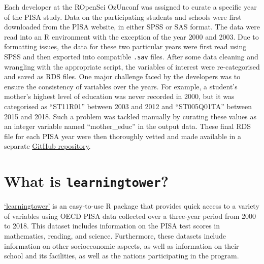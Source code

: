 Each developer at the ROpenSci OzUnconf was assigned to curate a
specific year of the PISA study. Data on the participating students and
schools were first downloaded from the PISA website, in either SPSS or
SAS format. The data were read into an R environment with the exception
of the year 2000 and 2003. Due to formatting issues, the data for these
two particular years were first read using SPSS and then exported into
compatible \texttt{.sav} files. After some data cleaning and wrangling
with the appropriate script, the variables of interest were
re-categorised and saved as RDS files. One major challenge faced by the
developers was to ensure the consistency of variables over the years.
For example, a student's mother's highest level of education was never
recorded in 2000, but it was categorised as ``ST11R01'' between 2003 and
2012 and ``ST005Q01TA'' between 2015 and 2018. Such a problem was
tackled manually by curating these values as an integer variable named
``mother\_educ'' in the output data. These final RDS file for each PISA
year were then thoroughly vetted and made available in a separate
\href{https://github.com/kevinwang09/learningtower_masonry}{GitHub
repository}.

\hypertarget{what-is-learningtower}{%
\section{\texorpdfstring{What is
\texttt{learningtower}?}{What is learningtower?}}\label{what-is-learningtower}}

\href{https://cran.r-project.org/web/packages/learningtower/index.html}{`learningtower'}
is an easy-to-use R package that provides quick access to a variety of
variables using OECD PISA data collected over a three-year period from
2000 to 2018. This dataset includes information on the PISA test scores
in mathematics, reading, and science. Furthermore, these datasets
include information on other socioeconomic aspects, as well as
information on their school and its facilities, as well as the nations
participating in the program.

